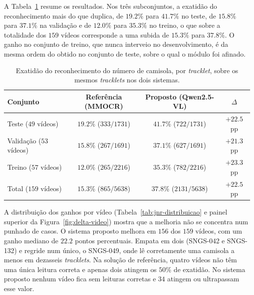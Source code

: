 A Tabela~\ref{tab:jnr} resume os resultados. Nos três subconjuntos, a exatidão do reconhecimento mais
do que duplica, de $19.2\%$ para $41.7\%$ no teste, de $15.8\%$ para
$37.1\%$ na validação e de $12.0\%$ para $35.3\%$ no treino, o que sobre a
totalidade dos $159$ vídeos corresponde a uma subida de $15.3\%$ para $37.8\%$. O ganho no
conjunto de treino, que nunca interveio no desenvolvimento, é da mesma ordem do obtido no conjunto de
teste, sobre o qual o módulo foi afinado.

\begin{table}[htbp]
    \centering
    \caption{Exatidão do reconhecimento do número de camisola, por \emph{tracklet}, sobre os mesmos
    \emph{tracklets} nos dois sistemas.}
    \label{tab:jnr}
    \begin{tabular}{|l|c|c|c|}
        \hline
        \textbf{Conjunto} & \textbf{Referência (MMOCR)} & \textbf{Proposto (Qwen2.5-VL)} & \textbf{$\Delta$} \\
        \hline
        Teste ($49$ vídeos)     & $19.2\%$ ($333/1731$)   & $41.7\%$ ($722/1731$)   & $+22.5$ pp \\
        \hline
        Validação ($53$ vídeos) & $15.8\%$ ($267/1691$) & $37.1\%$ ($627/1691$) & $+21.3$ pp \\
        \hline
        Treino ($57$ vídeos)    & $12.0\%$ ($265/2216$) & $35.3\%$ ($782/2216$) & $+23.3$ pp \\
        \hline
        Total ($159$ vídeos)    & $15.3\%$ ($865/5638$)     & $37.8\%$ ($2131/5638$)     & $+22.5$ pp \\
        \hline
    \end{tabular}
\end{table}

A distribuição dos ganhos por vídeo (Tabela~\ref{tab:jnr-distribuicao} e painel superior da
Figura~\ref{fig:delta-video}) mostra que a melhoria não se concentra num punhado de casos. O
sistema proposto melhora em $156$ dos $159$ vídeos, com um ganho mediano de $22.2$ pontos
percentuais. Empata em dois (SNGS-042 e SNGS-132) e regride num único, o SNGS-049, onde lê
corretamente uma camisola a menos em dezasseis \emph{tracklets}. Na solução de referência, quatro
vídeos não têm uma única leitura correta e apenas dois atingem os $50\%$ de exatidão. No sistema
proposto nenhum vídeo fica sem leituras corretas e $34$ atingem ou ultrapassam esse valor.

